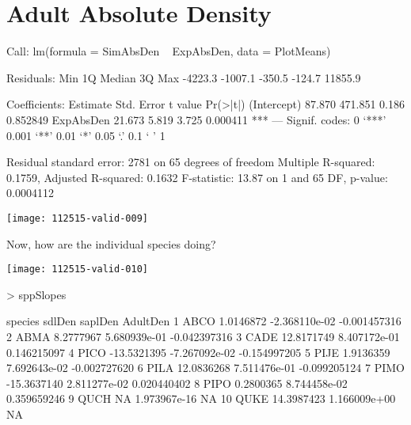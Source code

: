 \documentclass{article}
\begin{document}
\section{Adult Absolute Density}
\begin{Schunk}
\begin{Soutput}
Call:
lm(formula = SimAbsDen ~ ExpAbsDen, data = PlotMeans)

Residuals:
    Min      1Q  Median      3Q     Max 
-4223.3 -1007.1  -350.5  -124.7 11855.9 

Coefficients:
            Estimate Std. Error t value Pr(>|t|)    
(Intercept)   87.870    471.851   0.186 0.852849    
ExpAbsDen     21.673      5.819   3.725 0.000411 ***
---
Signif. codes:  0 ‘***’ 0.001 ‘**’ 0.01 ‘*’ 0.05 ‘.’ 0.1 ‘ ’ 1

Residual standard error: 2781 on 65 degrees of freedom
Multiple R-squared:  0.1759,	Adjusted R-squared:  0.1632 
F-statistic: 13.87 on 1 and 65 DF,  p-value: 0.0004112
\end{Soutput}
\end{Schunk}
\texttt{[image: 112515-valid-009]}

Now, how are the individual species doing?

\texttt{[image: 112515-valid-010]}
\begin{Schunk}
\begin{Sinput}
>   sppSlopes
\end{Sinput}
\begin{Soutput}
   species      sdlDen       saplDen     AdultDen
1     ABCO   1.0146872 -2.368110e-02 -0.001457316
2     ABMA   8.2777967  5.680939e-01 -0.042397316
3     CADE  12.8171749  8.407172e-01  0.146215097
4     PICO -13.5321395 -7.267092e-02 -0.154997205
5     PIJE   1.9136359  7.692643e-02 -0.002727620
6     PILA  12.0836268  7.511476e-01 -0.099205124
7     PIMO -15.3637140  2.811277e-02  0.020440402
8     PIPO   0.2800365  8.744458e-02  0.359659246
9     QUCH          NA  1.973967e-16           NA
10    QUKE  14.3987423  1.166009e+00           NA
\end{Soutput}
\end{Schunk}




\newpage
\end{document}
